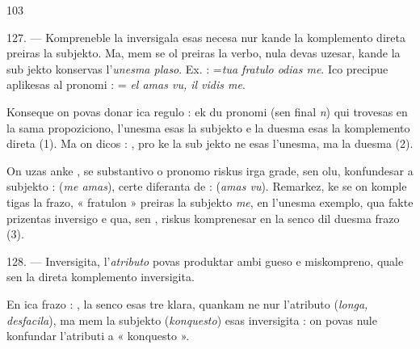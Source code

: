 \begin{VUpage}[107]{103}

127. --- Kompreneble la  inversigala esas necesa nur\nl
kande la komplemento direta preiras la subjekto. Ma, mem\nl
se ol preiras la verbo, nula  devas uzesar, kande la sub\cc
jekto konservas l'\textit{unesma plaso}. Ex. : \nl
=\textit{tua fratulo odias me}. Ico precipue aplikesas al pronomi :\nl
{} = \textit{el amas vu, il vidis me}.

Konseque on povas donar ica regulo : ek du pronomi\nl
(sen final \textit{n}) qui trovesas en la sama propoziciono, l'unesma\nl
esas la subjekto e la duesma esas la komplemento direta (1).\nl
Ma on dicos : , pro ke la sub\cc
jekto ne esas l'unesma, ma la duesma (2).

On uzas anke , se substantivo o pronomo riskus irga\cc
grade, sen olu, konfundesar a subjekto : \nl
{} (\textit{me amas}), certe diferanta de : \nl
{} (\textit{amas vu}). Remarkez, ke se on komple\cc
tigas la frazo, « fratulon » preiras la subjekto \textit{me}, en\nl
l'unesma exemplo, qua fakte prizentas inversigo e qua, sen ,\nl
riskus komprenesar en la senco dil duesma frazo (3).

\VUblanc{5.66pt}%
128. --- Inversigita, l'\textit{atributo} povas produktar ambi\cc
gueso e miskompreno, quale sen  la direta komplemento\nl
inversigita.

En ica frazo : , la senco\nl
esas tre klara, quankam ne nur l'atributo (\textit{longa, desfacila}),\nl
ma mem la subjekto (\textit{konquesto}) esas inversigita : on povas\nl
nule konfundar l'atributi a « konquesto ».


\end{VUpage}
